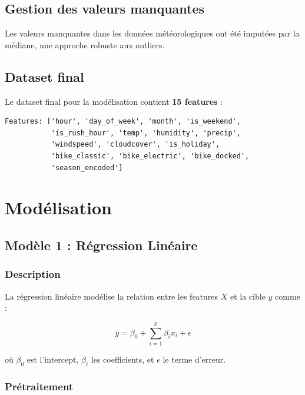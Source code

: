 \documentclass[12pt,a4paper]{article}
\begin{document}
\subsection{Gestion des valeurs manquantes}

Les valeurs manquantes dans les données météorologiques ont été imputées par la médiane, une approche robuste aux outliers.

\subsection{Dataset final}

Le dataset final pour la modélisation contient \textbf{15 features} :

\begin{lstlisting}[caption=Liste des features finales]
Features: ['hour', 'day_of_week', 'month', 'is_weekend', 
           'is_rush_hour', 'temp', 'humidity', 'precip', 
           'windspeed', 'cloudcover', 'is_holiday',
           'bike_classic', 'bike_electric', 'bike_docked',
           'season_encoded']
\end{lstlisting}

\section{Modélisation}

\subsection{Modèle 1 : Régression Linéaire}

\subsubsection{Description}

La régression linéaire modélise la relation entre les features $X$ et la cible $y$ comme :

\begin{equation}
y = \beta_0 + \sum_{i=1}^{p} \beta_i x_i + \epsilon
\end{equation}

où $\beta_0$ est l'intercept, $\beta_i$ les coefficients, et $\epsilon$ le terme d'erreur.

\subsubsection{Prétraitement}
\end{document}
